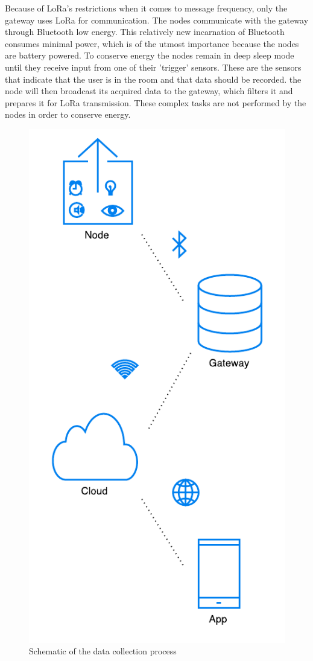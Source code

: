 \documentclass{below-ext}
\begin{document}
Because of LoRa's restrictions when it comes to message frequency, only the gateway uses LoRa for communication. The nodes communicate with the gateway through Bluetooth low energy. This relatively new incarnation of Bluetooth consumes minimal power, which is of the utmost importance because the nodes are battery powered. To conserve energy the nodes remain in deep sleep mode until they receive input from one of their  'trigger' sensors. These are the sensors that indicate that the user is in the room and that data should be recorded. the node will then broadcast its acquired data to the gateway, which filters it and prepares it for LoRa transmission. These complex tasks are not performed by the nodes in order to conserve energy.  

\begin{figure}
\centering
\includegraphics[scale=0.6]{dataproces.pdf}
\caption{Schematic of the data collection process}
\label{fig:process}
\end{figure}
\end{document}
